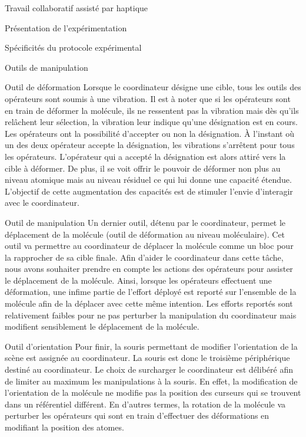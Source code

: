 \documentclass[myfrancais,ngerman,english,frenchb]{mythesis}
\begin{document}
\begin{mychapter}{Travail collaboratif assisté par haptique}
\begin{mysection}{Présentation de l'expérimentation}
\begin{mysubsection}{Spécificités du protocole expérimental}
\begin{mysubsubsection}{Outils de manipulation}
\begin{myparagraph}{Outil de déformation}
						Lorsque le coordinateur désigne une cible, tous les outils des opérateurs sont soumis à une vibration.
						Il est à noter que si les opérateurs sont en train de déformer la molécule, ils ne ressentent pas la vibration mais dès qu'ils relâchent leur sélection, la vibration leur indique qu'une désignation est en cours.
						Les opérateurs ont la possibilité d'accepter ou non la désignation.
						À l'instant où un des deux opérateur accepte la désignation, les vibrations s'arrêtent pour tous les opérateurs.
						L'opérateur qui a accepté la désignation est alors attiré vers la cible à déformer.
						De plus, il se voit offrir le pouvoir de déformer non plus au niveau atomique mais au niveau résiduel ce qui lui donne une capacité étendue.
						L'objectif de cette augmentation des capacités est de stimuler l'envie d'interagir avec le coordinateur.
					\end{myparagraph}
					\begin{myparagraph}{Outil de manipulation}
						Un dernier outil, détenu par le coordinateur, permet le déplacement de la molécule (outil de déformation au niveau moléculaire).
						Cet outil va permettre au coordinateur de déplacer la molécule comme un bloc pour la rapprocher de sa cible finale.
						Afin d'aider le coordinateur dans cette tâche, nous avons souhaiter prendre en compte les actions des opérateurs pour assister le déplacement de la molécule.
						Ainsi, lorsque les opérateurs effectuent une déformation, une infime partie de l'effort déployé est reporté sur l'ensemble de la molécule afin de la déplacer avec cette même intention.
						Les efforts reportés sont relativement faibles pour ne pas perturber la manipulation du coordinateur mais modifient sensiblement le déplacement de la molécule.
					\end{myparagraph}
					\begin{myparagraph}{Outil d'orientation}
						Pour finir, la souris permettant de modifier l'orientation de la scène est assignée au coordinateur.
						La souris est donc le troisième périphérique destiné au coordinateur.
						Le choix de surcharger le coordinateur est délibéré afin de limiter au maximum les manipulations à la souris.
						En effet, la modification de l'orientation de la molécule ne modifie pas la position des curseurs qui se trouvent dans un référentiel différent.
						En d'autres termes, la rotation de la molécule va perturber les opérateurs qui sont en train d'effectuer des déformations en modifiant la position des atomes.

\end{myparagraph}
\end{mysubsubsection}
\end{mysubsection}
\end{mysection}
\end{mychapter}
\end{document}
